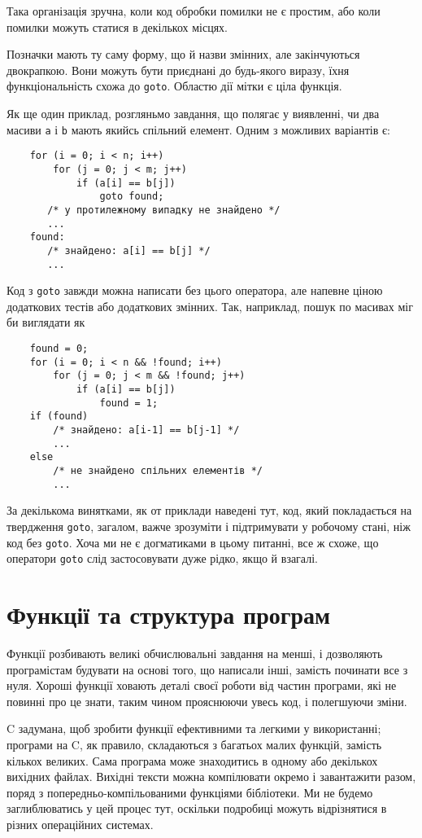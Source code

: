 \documentclass[a4paper,12pt]{book}
\begin{document}
  Така організація зручна, коли код обробки помилки не є простим, або коли помилки
  можуть статися в декількох місцях.

  Позначки мають ту саму форму, що й назви змінних, але закінчуються двокрапкою. Вони
  можуть бути приєднані до будь-якого виразу, їхня функціональність схожа до
  \texttt{goto}. Областю дії мітки є ціла функція.

  Як ще один приклад, розгляньмо завдання, що полягає у виявленні, чи два масиви
  \texttt{a} і \texttt{b} мають якийсь спільний елемент. Одним з можливих варіантів є:
  \begin{verbatim}
    for (i = 0; i < n; i++)
        for (j = 0; j < m; j++)
            if (a[i] == b[j])
                goto found;
       /* у протилежному випадку не знайдено */
       ...
    found:
       /* знайдено: a[i] == b[j] */
       ...
  \end{verbatim}

  Код з
  \texttt{goto} завжди можна написати без цього оператора, але напевне ціною додаткових
  тестів або додаткових змінних. Так, наприклад, пошук по масивах міг би виглядати як
  \begin{verbatim}
    found = 0;
    for (i = 0; i < n && !found; i++)
        for (j = 0; j < m && !found; j++)
            if (a[i] == b[j])
                found = 1;
    if (found)
        /* знайдено: a[i-1] == b[j-1] */
        ...
    else
        /* не знайдено спільних елементів */
        ...
  \end{verbatim}

  За декількома винятками, як от приклади наведені тут, код, який покладається на
  твердження \texttt{goto}, загалом, важче зрозуміти і підтримувати у робочому стані, ніж
  код без \texttt{goto}. Хоча ми не є догматиками в цьому питанні, все ж схоже, що
  оператори \texttt{goto} слід застосовувати дуже рідко, якщо й взагалі.

\chapter{Функції та структура програм}

\label{f0:ch4}
  Функції розбивають великі обчислювальні завдання на менші, і дозволяють програмістам
  будувати на основі того, що написали інші, замість починати все з нуля. Хороші функції
  ховають деталі своєї роботи від частин програми, які не повинні про це знати, таким
  чином прояснюючи увесь код, і полегшуючи зміни.

  C задумана, щоб зробити функції ефективними та легкими у використанні; програми на
  C, як правило, складаються з багатьох малих функцій, замість кількох великих. Сама
  програма може знаходитись в одному або декількох вихідних файлах. Вихідні тексти можна
  компілювати окремо і завантажити разом, поряд з попередньо-компільованими функціями
  бібліотеки. Ми не будемо заглиблюватись у цей процес тут, оскільки подробиці можуть
  відрізнятися в різних операційних системах.
\end{document}
